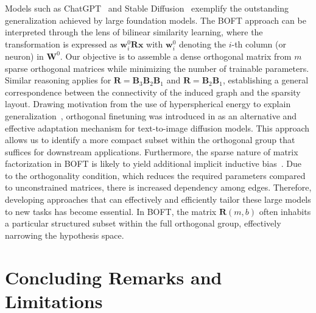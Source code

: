 Models such as ChatGPT~\cite{brown2020language,chen2021evaluating} and Stable Diffusion~\cite{rombach2022high} exemplify the outstanding generalization achieved by large foundation models. The BOFT approach can be interpreted through the lens of bilinear similarity learning, where the transformation is expressed as $\bm{w}^0_i\bm{R}\bm{x}$ with $\bm{w}^0_i$ denoting the $i$-th column (or neuron) in $\bm{W}^0$. Our objective is to assemble a dense orthogonal matrix from $m$ sparse orthogonal matrices while minimizing the number of trainable parameters. Similar reasoning applies for $\bm{R}=\bm{B}_3\bm{B}_2\bm{B}_1$ and $\bm{R}=\bm{B}_2\bm{B}_1$, establishing a general correspondence between the connectivity of the induced graph and the sparsity layout. Drawing motivation from the use of hyperspherical energy to explain generalization~\cite{liu2018learning,liu2021orthogonal}, orthogonal finetuning was introduced in \cite{qiu2023controlling} as an alternative and effective adaptation mechanism for text-to-image diffusion models. This approach allows us to identify a more compact subset within the orthogonal group that suffices for downstream applications. Furthermore, the sparse nature of matrix factorization in BOFT is likely to yield additional implicit inductive bias~\cite{gunasekar2017implicit,li2018algorithmic,liu2019neural}. Due to the orthogonality condition, which reduces the required parameters compared to unconstrained matrices, there is increased dependency among edges. Therefore, developing approaches that can effectively and efficiently tailor these large models to new tasks has become essential. In BOFT, the matrix $\bm{R}(m,b)$ often inhabits a particular structured subset within the full orthogonal group, effectively narrowing the hypothesis space. 

\section{Concluding Remarks and Limitations}

